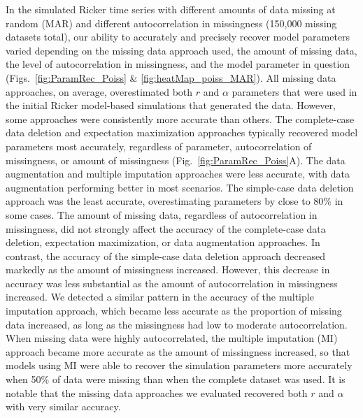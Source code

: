 \documentclass{article}
\begin{document}
In the simulated Ricker time series with different amounts of data missing at random (MAR) and different autocorrelation in missingness (150,000 missing datasets total), our ability to accurately and precisely recover model parameters varied depending on the missing data approach used, the amount of missing data, the level of autocorrelation in missingness, and the model parameter in question (Figs.\ \ref{fig:ParamRec_Poiss} \& \ref{fig:heatMap_poiss_MAR}). All missing data approaches, on average, overestimated both $r$ and $\alpha$ parameters that were used in the initial Ricker model-based simulations that generated the data. However, some approaches were consistently more accurate than others. The complete-case data deletion and expectation maximization approaches typically recovered model parameters most accurately, regardless of parameter, autocorrelation of missingness, or amount of missingness (Fig.\ \ref{fig:ParamRec_Poiss}A). The data augmentation and multiple imputation approaches were less accurate, with data augmentation performing better in most scenarios. The simple-case data deletion approach was the least accurate, overestimating parameters by close to 80\% in some cases. The amount of missing data, regardless of autocorrelation in missingness, did not strongly affect the accuracy of the complete-case data deletion, expectation maximization, or data augmentation approaches. In contrast, the accuracy of the simple-case data deletion approach decreased markedly as the amount of missingness increased. However, this decrease in accuracy was less substantial as the amount of autocorrelation in missingness increased. We detected a similar pattern in the accuracy of the multiple imputation approach, which became less accurate as the proportion of missing data increased, as long as the missingness had low to moderate autocorrelation. When missing data were highly autocorrelated, the multiple imputation (MI) approach became more accurate as the amount of missingness increased, so that models using MI were able to recover the simulation parameters more accurately when 50\% of data were missing than when the complete dataset was used. It is notable that the missing data approaches we evaluated recovered both $r$ and $\alpha$  with very similar accuracy. 
\end{document}
